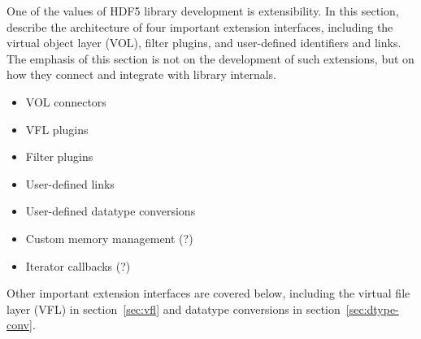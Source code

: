 
One of the values of HDF5 library development is extensibility. In this section, describe the architecture of four important extension interfaces, including the virtual object layer (VOL), filter plugins, and user-defined identifiers and links. The emphasis of this section is not on the development of such extensions, but on how they connect and integrate with library internals.

\begin{itemize}
    \item VOL connectors
    \item VFL plugins
    \item Filter plugins
    \item User-defined links
    \item User-defined datatype conversions
    \item Custom memory management (?)
    \item Iterator callbacks (?)
\end{itemize}

Other important extension interfaces are covered below, including the virtual file layer (VFL) in section~\ref{sec:vfl} and datatype conversions in section~\ref{sec:dtype-conv}.
